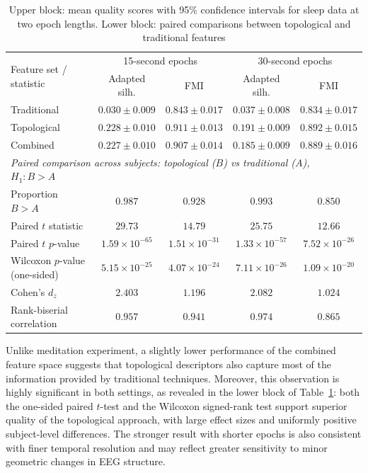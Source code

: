 \documentclass[pdflatex,sn-basic,Numbered]{sn-jnl}
\begin{document}
\begin{table}[t]
\centering
\caption{Upper block: mean quality scores with 95\% confidence intervals for sleep data at two epoch lengths. Lower block: paired comparisons between topological and traditional features}\label{table2}
\begin{tabular}{lcccc}
  \toprule
    \multirow{2}{*}{Feature set / statistic} & \multicolumn{2}{c}{15-second epochs} & \multicolumn{2}{c}{30-second epochs} \\
     & Adapted silh. & FMI & Adapted silh. & FMI \\
  \midrule
    Traditional & $0.030 \pm 0.009$ & $0.843 \pm 0.017$ & $0.037 \pm 0.008$ & $0.834 \pm 0.017$ \\
    Topological & $0.228 \pm 0.010$ & $0.911 \pm 0.013$ & $0.191 \pm 0.009$ & $0.892 \pm 0.015$ \\
    Combined    & $0.227 \pm 0.010$ & $0.907 \pm 0.014$ & $0.185 \pm 0.009$ & $0.889 \pm 0.016$ \\
  \midrule
  \multicolumn{5}{l}{\textit{Paired comparison across subjects: topological ($B$) vs traditional ($A$), $H_1: B > A$}} \\
    Proportion $B > A$               & $0.987$                & $0.928$                & $0.993$ & $0.850$ \\
    Paired $t$ statistic             & $29.73$                & $14.79$                & $25.75$ & $12.66$ \\
    Paired $t$ $p$-value & $1.59 \times 10^{-65}$ & $1.51 \times 10^{-31}$ & $1.33 \times 10^{-57}$ & $7.52 \times 10^{-26}$ \\
    Wilcoxon $p$-value (one-sided) & $5.15 \times 10^{-25}$ & $4.07 \times 10^{-24}$ & $7.11 \times 10^{-26}$ & $1.09 \times 10^{-20}$ \\
    Cohen's $d_z$ & $2.403$ & $1.196$ & $2.082$ & $1.024$ \\
    Rank-biserial correlation & $0.957$ & $0.941$ & $0.974$ & $0.865$ \\
  \bottomrule
\end{tabular}
\end{table}

Unlike meditation experiment, a slightly lower performance of the combined feature space suggests that topological descriptors also capture most of the information provided by traditional techniques. Moreover, this observation is highly significant in both settings, as revealed in the lower block of Table~\ref{table2}: both the one-sided paired $t$-test and the Wilcoxon signed-rank test support superior quality of the topological approach, with large effect sizes and uniformly positive subject-level differences. The stronger result with shorter epochs is also consistent with finer temporal resolution and may reflect greater sensitivity to minor geometric changes in EEG structure.
\end{document}
